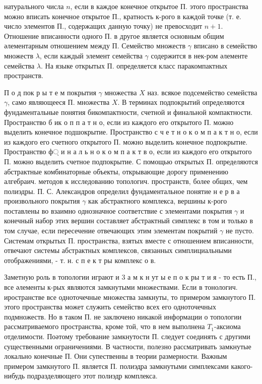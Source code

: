 \documentclass[10pt]{article}
\begin{document}
натурального числа $n$, если в каждое конечное открытое П. этого пространства можно вписать конечное открытое П., кратность к-рого в каждой точке (т. е. число элементов П., содержащих данную точку) не превосходит $n+1$. Отношение вписанности одного П. в другое является основным общим әлементарным отношением между П. Семейство множеств $\gamma$ вписано в семейство множеств $\lambda$, если каждый элемент семейства $\gamma$ содержится в нек-ром әлементе семейства $\lambda$. На языке открытых П. определяется класс паракомпактных пространств.



П о д пок р ы т е м покрытия $\gamma$ множества $X$ наз. всякое подсемейство семейства $\gamma$, само являющееся П. множества $X$. В терминах подпокрытий определяются фундаментальные понятия бикомпактности, счетной и финальной компактности. Пространство б ик о п п а т н о, если из каждого его открытого П. можно выделить конечное подшокрытие. Пространство с ч е т н о к о м п а к т н о, если из каждого его счетного открытого П. можно выделить конечное подпокрытие. Пространство ф্ и н а л ь н о к о м п а к т в о, если из каждого его открытого П. можно выделить счетное подпокрытие. С помощью открытых П. определяются абстрактные комбинаторные объекты, открывающие дорогу применению алгебраич. методов к исследованию топологич. пространств, более общих, чем полиэдры. П. С. Александров определил фундаментальное понятие н е р в а произвольного покрытия $\gamma$ как абстрактного комплекса, вершины к-рого поставлены во взаимно однозначное соответствие с элементами покрытия $\gamma$ и конечный набор этих вершин составляет абстрактный симплекс в том и только в том случае, если пересечение отвечающих этим элементам покрытий $\gamma$ не пусто. Системам открытых П. пространства, взятых вместе с отношением вписанности, отвечают системы абстрактных комплексов, связанных симплициальными отображениями, - т. н. с п е к т ры комплекс о в.



Заметную роль в топологии играют и 3 а м к н ут ы е п о к ры т и я - то есть П., все әлементы к-рых являются замкнутыми множествами. Если в тонологич. иространстве все одноточечные множества замкнуты, то примером замкнутого П. этого пространства может служить семейство всех его одноточечных подмножеств. Но в таком П. не заключено никакой информации о топологии рассматриваемого пространства, кроме той, что в нем выполнена $T_{1}$-аксиома отделимости. Поәтому требование замкнутости П. следует соединять с другими существенными ограничениями. В частности, полезно рассматривать замкнутые локально конечные П. Они супественны в теории размерности. Важным примером замкнутого П. является П. полиэдра замкнутыми симплексами какого-нибудь подразделяющего этот полиэдр комплекса.
\end{document}
